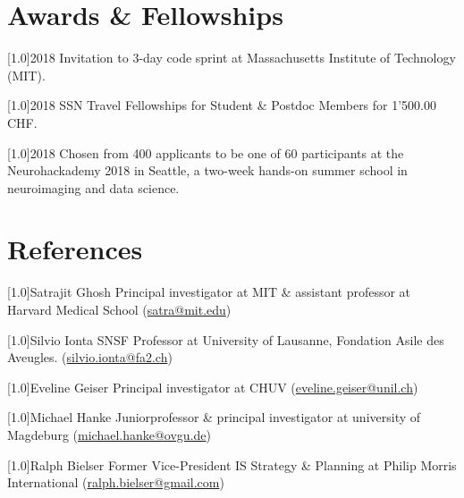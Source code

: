 \documentclass[english]{cv-style}
\begin{document}
\section{Awards \& Fellowships}
\begin{publist}

\publications
  {\scalebox{.8}[1.0]{2018}}
  {Invitation to 3-day code sprint at Massachusetts Institute of Technology (MIT).}

\publications
  {\scalebox{.8}[1.0]{2018}}
  {SSN Travel Fellowships for Student \& Postdoc Members for 1'500.00 CHF.}

\publications
  {\scalebox{.8}[1.0]{2018}}
  {Chosen from 400 applicants to be one of 60 participants at the Neurohackademy 2018 in Seattle, a two-week hands-on summer school in neuroimaging and data science.}

\end{publist}


\section{References}
\begin{reflist}
  {\scalebox{1.0}[1.0]{Satrajit Ghosh}}
  {Principal investigator at MIT \& assistant professor at Harvard Medical School (\href{mailto:satra@mit.edu}{satra@mit.edu})}

  {\scalebox{1.0}[1.0]{Silvio Ionta}}
  {SNSF Professor at University of Lausanne, Fondation Asile des Aveugles. (\href{mailto:silvio.ionta@fa2.ch}{silvio.ionta@fa2.ch})}

  {\scalebox{1.0}[1.0]{Eveline Geiser}}
  {Principal investigator at CHUV (\href{mailto:eveline.geiser@unil.ch}{eveline.geiser@unil.ch})}

  {\scalebox{1.0}[1.0]{Michael Hanke}}
  {Junior\-professor \& principal investigator at university of Magdeburg (\href{mailto:michael.hanke@ovgu.de}{michael.hanke@ovgu.de})}

  {\scalebox{1.0}[1.0]{Ralph Bielser}}
  {Former Vice-President IS Strategy \& Planning at Philip
Morris International (\href{mailto:ralph.bielser@gmail.com}{ralph.bielser@gmail.com})}

\end{reflist}

\end{document}
